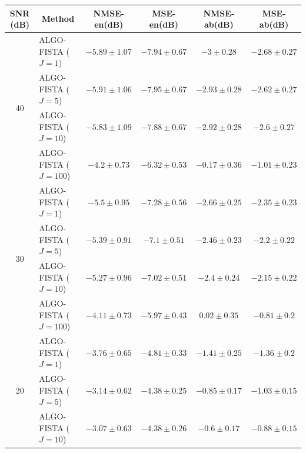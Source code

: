 \newpage

\begin{table}[h]
\centering
\begin{adjustbox}{max width=\textwidth}
\begin{tabular}{|c|l|c|c|c|c|}
\hline
SNR (dB)            & \multicolumn{1}{c|}{Method}   & NMSE-en(dB)         & MSE-en(dB)          & NMSE-ab(dB)         & MSE-ab(dB)          \tabularnewline \hline
\multirow{4}{*}{40} & ALGO-FISTA ($J=1$)            & $-5.89    \pm 1.07$ & $-7.94    \pm 0.67$ & $-3       \pm 0.28$ & $-2.68    \pm 0.27$ \tabularnewline
                    & ALGO-FISTA ($J=5$)            & $-5.91    \pm 1.06$ & $-7.95    \pm 0.67$ & $-2.93    \pm 0.28$ & $-2.62    \pm 0.27$ \tabularnewline
                    & ALGO-FISTA ($J=10$)           & $-5.83    \pm 1.09$ & $-7.88    \pm 0.67$ & $-2.92    \pm 0.28$ & $-2.6     \pm 0.27$ \tabularnewline
                    & ALGO-FISTA ($J=100$)          & $-4.2     \pm 0.73$ & $-6.32    \pm 0.53$ & $-0.17    \pm 0.36$ & $-1.01    \pm 0.23$ \tabularnewline \hline
\multirow{4}{*}{30} & ALGO-FISTA ($J=1$)            & $-5.5     \pm 0.95$ & $-7.28    \pm 0.56$ & $-2.66    \pm 0.25$ & $-2.35    \pm 0.23$ \tabularnewline
                    & ALGO-FISTA ($J=5$)            & $-5.39    \pm 0.91$ & $-7.1     \pm 0.51$ & $-2.46    \pm 0.23$ & $-2.2     \pm 0.22$ \tabularnewline
                    & ALGO-FISTA ($J=10$)           & $-5.27    \pm 0.96$ & $-7.02    \pm 0.51$ & $-2.4     \pm 0.24$ & $-2.15    \pm 0.22$ \tabularnewline
                    & ALGO-FISTA ($J=100$)          & $-4.11    \pm 0.73$ & $-5.97    \pm 0.43$ & $0.02     \pm 0.35$ & $-0.81    \pm 0.2$  \tabularnewline \hline
\multirow{4}{*}{20} & ALGO-FISTA ($J=1$)            & $-3.76    \pm 0.65$ & $-4.81    \pm 0.33$ & $-1.41    \pm 0.25$ & $-1.36    \pm 0.2$  \tabularnewline
                    & ALGO-FISTA ($J=5$)            & $-3.14    \pm 0.62$ & $-4.38    \pm 0.25$ & $-0.85    \pm 0.17$ & $-1.03    \pm 0.15$ \tabularnewline
                    & ALGO-FISTA ($J=10$)           & $-3.07    \pm 0.63$ & $-4.38    \pm 0.26$ & $-0.6     \pm 0.17$ & $-0.88    \pm 0.15$ \tabularnewline

\end{tabular}
\end{adjustbox}
\end{table}
